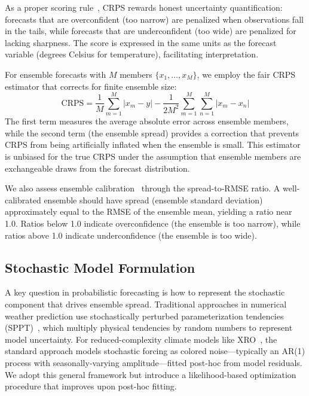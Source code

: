As a proper scoring rule~\cite{gneiting2014probabilistic}, CRPS rewards honest uncertainty quantification: forecasts that are overconfident (too narrow) are penalized when observations fall in the tails, while forecasts that are underconfident (too wide) are penalized for lacking sharpness. The score is expressed in the same units as the forecast variable (degrees Celsius for temperature), facilitating interpretation.

For ensemble forecasts with $M$ members $\{x_1, \ldots, x_M\}$, we employ the fair CRPS estimator that corrects for finite ensemble size:
\begin{equation}
    \text{CRPS} = \frac{1}{M}\sum_{m=1}^{M} |x_m - y| - \frac{1}{2M^2}\sum_{m=1}^{M}\sum_{n=1}^{M} |x_m - x_n|
    \label{eq:crps_fair}
\end{equation}
The first term measures the average absolute error across ensemble members, while the second term (the ensemble spread) provides a correction that prevents CRPS from being artificially inflated when the ensemble is small. This estimator is unbiased for the true CRPS under the assumption that ensemble members are exchangeable draws from the forecast distribution.

We also assess ensemble calibration~\cite{raftery2005using} through the spread-to-RMSE ratio. A well-calibrated ensemble should have spread (ensemble standard deviation) approximately equal to the RMSE of the ensemble mean, yielding a ratio near 1.0. Ratios below 1.0 indicate overconfidence (the ensemble is too narrow), while ratios above 1.0 indicate underconfidence (the ensemble is too wide).

\subsection{Stochastic Model Formulation}

A key question in probabilistic forecasting is how to represent the stochastic component that drives ensemble spread. Traditional approaches in numerical weather prediction use stochastically perturbed parameterization tendencies (SPPT)~\cite{buizza1999stochastic}, which multiply physical tendencies by random numbers to represent model uncertainty. For reduced-complexity climate models like XRO~\cite{zhao2024xro}, the standard approach models stochastic forcing as colored noise---typically an AR(1) process with seasonally-varying amplitude---fitted post-hoc from model residuals. We adopt this general framework but introduce a likelihood-based optimization procedure that improves upon post-hoc fitting.

